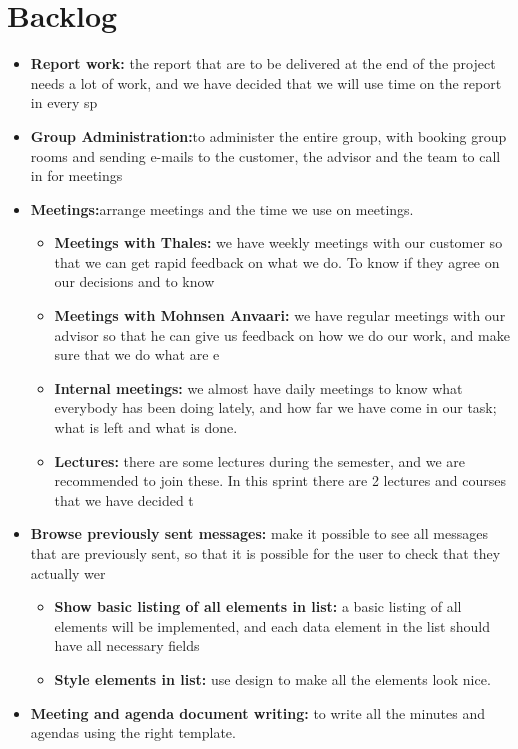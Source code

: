 \section{Backlog}

\begin{itemize}
\item{}\textbf{Report work:} the report that are to be delivered at the end of the project needs a lot of work, and we have decided that we will use time on the report in every sp
\item{}\textbf{Group Administration:}to administer the entire group, with booking group rooms and sending e-mails to the customer, the advisor and the team to call in for meetings
\item{}\textbf{Meetings:}arrange meetings and the time we use on meetings.
\begin{itemize}
\item{}\textbf{Meetings with Thales:} we have weekly meetings with our customer so that we can get rapid feedback on what we do. To know if they agree on our decisions and to know
\item{}\textbf{Meetings with Mohnsen Anvaari:} we have regular meetings with our advisor so that he can give us feedback on how we do our work, and make sure that we do what are e
\item{}\textbf{Internal meetings:} we almost have daily meetings to know what everybody has been doing lately, and how far we have come in our task; what is left and what is done.
\item{}\textbf{Lectures:} there are some lectures during the semester, and we are recommended to join these. In this sprint there are 2 lectures and courses that we have decided t
\end{itemize}
\item{}\textbf{Browse previously sent messages:} make it possible to see all messages that are previously sent, so that it is possible for the user to check that they actually wer
\begin{itemize}
\item{}\textbf{Show basic listing of all elements in list:} a basic listing of all elements will be implemented, and each data element in the list should have all necessary fields
\item{}\textbf{Style elements in list:} use design to make all the elements look nice.
\end{itemize}
\item{}\textbf{Meeting and agenda document writing:} to write all the minutes and agendas using the right template.

\end{itemize}

